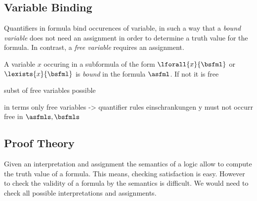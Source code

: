
        \subsection{Variable Binding}
            \label{sec:FOL-variable-binding}

            Quantifiers in formula bind occurences of variable, in such a way that a \emph{bound variable} does not need an assignment in order to determine a truth value for the formula.
            In contrast, a \emph{free variable} requires an assignment.


            \begin{definition}
                A variable $x$ occuring in a subformula of the form $\lforall{x}{\bsfml}$ or $\lexists{x}{\bsfml}$ is \emph{bound} in the formula $\asfml$.
                If not it is free
            \end{definition}

            subst of free variables possible

            in terms only free variables -> quantifier rules einschrankungen
            y must not occurr free in $\asfmls,\bsfmls$

        \subsection{Proof Theory}
            \label{sec:FOL-proof-theory}

            
            Given an interpretation and assignment the semantics of a logic allow to compute the truth value of a formula. This means, checking satisfaction is easy.
            However to check the validity of a formula by the semantics is difficult. We would need to check all possible interpretations and assignments.

